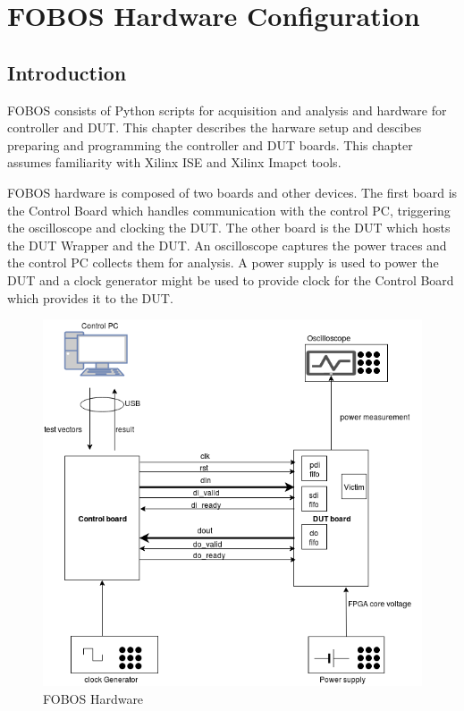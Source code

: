 \chapter{FOBOS Hardware Configuration} \label{chap:hardware-config}
\section{Introduction}
FOBOS consists of Python scripts for acquisition and analysis and hardware for controller and DUT.
This chapter describes the harware setup and descibes preparing and programming the controller and DUT boards.
This chapter assumes familiarity with Xilinx ISE and Xilinx Imapct tools.

FOBOS hardware is composed of two boards and other devices. The first board is the Control Board which handles communication with the control PC, triggering the oscilloscope and clocking the DUT.
The other board is the DUT which hosts the DUT Wrapper and the DUT.
An oscilloscope captures the power traces and the control PC collects them for analysis. 
A power supply is used to power the DUT and a clock generator might be used to provide clock for the Control Board which provides it to the DUT.

\begin{center}

\begin{figure}
  \label{fig:fobos-capture}
  \caption{FOBOS Hardware}
  \centering
   \includegraphics[scale=0.6]{../figures/FOBOS_Capture}
\end{figure}
\end{center}

